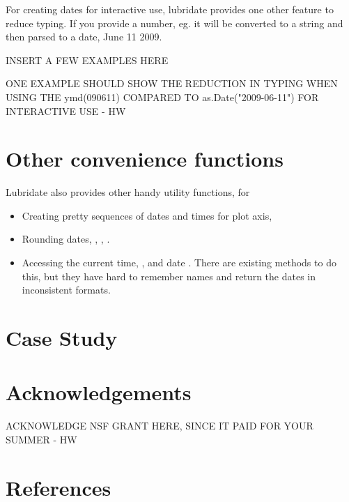 \documentclass[article]{jss}
\begin{document}
For creating dates for interactive use, lubridate provides one other feature to reduce typing.  If you provide a number, eg.  it will be converted to a string  and then parsed to a date, June 11 2009.  

INSERT A FEW EXAMPLES HERE

ONE EXAMPLE SHOULD SHOW THE REDUCTION IN TYPING WHEN USING THE ymd(090611) COMPARED TO as.Date("2009-06-11") FOR INTERACTIVE USE - HW


% 

\section{Other convenience functions}
\label{sec:utils}

Lubridate also provides other handy utility functions, for

\begin{itemize}
  \item Creating pretty sequences of dates and times for plot axis, 
  
  \item Rounding dates, , , .

  \item Accessing the current time, , and date .  There are existing methods to do this, but they have hard to remember names and return the dates in inconsistent formats.
  
\end{itemize}

\section{Case Study}

\section*{Acknowledgements}

ACKNOWLEDGE NSF GRANT HERE, SINCE IT PAID FOR YOUR SUMMER - HW

\section*{References}
\end{document}
